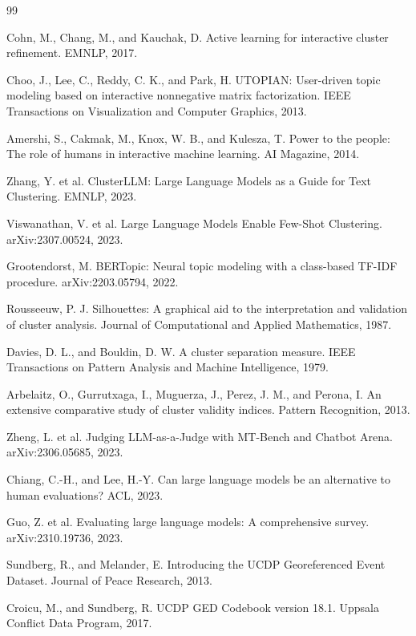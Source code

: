 \documentclass[11pt,a4paper]{article}
\begin{document}
\begin{thebibliography}{99}

Cohn, M., Chang, M., and Kauchak, D. Active learning for interactive cluster refinement. EMNLP, 2017.

Choo, J., Lee, C., Reddy, C. K., and Park, H. UTOPIAN: User-driven topic modeling based on interactive nonnegative matrix factorization. IEEE Transactions on Visualization and Computer Graphics, 2013.

Amershi, S., Cakmak, M., Knox, W. B., and Kulesza, T. Power to the people: The role of humans in interactive machine learning. AI Magazine, 2014.

Zhang, Y. et al. ClusterLLM: Large Language Models as a Guide for Text Clustering. EMNLP, 2023.

Viswanathan, V. et al. Large Language Models Enable Few-Shot Clustering. arXiv:2307.00524, 2023.

Grootendorst, M. BERTopic: Neural topic modeling with a class-based TF-IDF procedure. arXiv:2203.05794, 2022.

Rousseeuw, P. J. Silhouettes: A graphical aid to the interpretation and validation of cluster analysis. Journal of Computational and Applied Mathematics, 1987.

Davies, D. L., and Bouldin, D. W. A cluster separation measure. IEEE Transactions on Pattern Analysis and Machine Intelligence, 1979.

Arbelaitz, O., Gurrutxaga, I., Muguerza, J., Perez, J. M., and Perona, I. An extensive comparative study of cluster validity indices. Pattern Recognition, 2013.

Zheng, L. et al. Judging LLM-as-a-Judge with MT-Bench and Chatbot Arena. arXiv:2306.05685, 2023.

Chiang, C.-H., and Lee, H.-Y. Can large language models be an alternative to human evaluations? ACL, 2023.

Guo, Z. et al. Evaluating large language models: A comprehensive survey. arXiv:2310.19736, 2023.

Sundberg, R., and Melander, E. Introducing the UCDP Georeferenced Event Dataset. Journal of Peace Research, 2013.

Croicu, M., and Sundberg, R. UCDP GED Codebook version 18.1. Uppsala Conflict Data Program, 2017.

\end{thebibliography}
\end{document}
